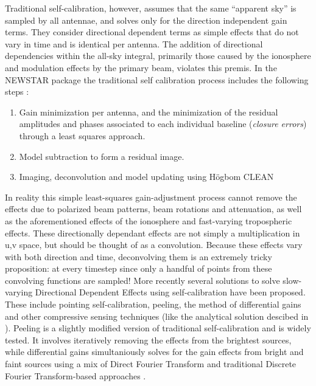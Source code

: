 \documentclass[a4paper,10pt]{report}
\begin{document}
 Traditional self-calibration, however, assumes that the same ``apparent sky'' is sampled by all antennae, and solves only for the direction independent gain terms. They consider directional dependent terms as simple effects that 
 do not vary in time and is identical per antenna. The addition of directional dependencies within the all-sky integral, primarily those caused by the ionosphere and modulation effects by the primary beam, violates this premis. In 
 the NEWSTAR package the traditional self calibration process includes the following steps \cite{2011A&A...527A.107S}:
 \begin{enumerate}
  \item Gain minimization per antenna, and the minimization of the residual amplitudes and phases associated to each individual baseline (\textit{closure errors}) through a least squares approach.
  \item Model subtraction to form a residual image.
  \item Imaging, deconvolution and model updating using H\"ogbom CLEAN
 \end{enumerate}
 
 In reality this simple least-squares gain-adjustment process cannot remove the effects due to polarized beam patterns, beam rotations and attenuation, as well as the aforementioned effects of the ionosphere and fast-varying tropospheric
 effects. These directionally dependant effects are not simply a multiplication in u,v space, but should be thought of as a convolution. Because these effects vary with both direction and time, deconvolving them is an extremely tricky proposition: 
 at every timestep since only a handful of points from these convolving functions are sampled! More recently several solutions to solve slow-varying Directional Dependent Effects using self-calibration have been proposed. These include pointing self-calibration,
 peeling, the method of differential gains and other compressive sensing techniques (like the analytical solution descibed in \cite{hardy2013direct}). Peeling is a slightly modified version of traditional self-calibration and is widely tested. It involves iteratively removing the effects from the brightest sources, while 
 differential gains simultaniously solves for the gain effects from bright and faint sources using a mix of Direct Fourier Transform and traditional Discrete Fourier Transform-based approaches \cite{2011A&A...527A.107S,2011A&A...527A.108S}.
 
\end{document}
